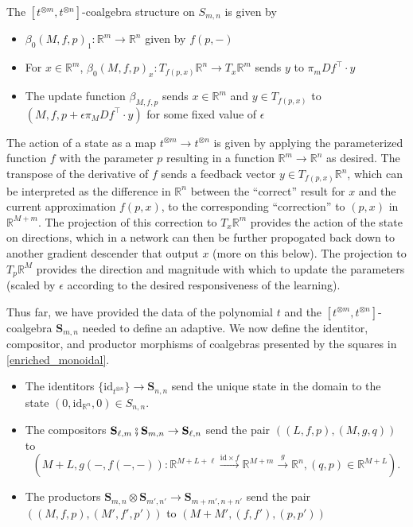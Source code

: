 \documentclass[11pt, one side, article]{memoir}
\theoremstyle{definition}
\theoremstyle{plain}
\newenvironment{definition}
  {\pushQED{\qed}\renewcommand{\qedsymbol}{$\lozenge$}\definitionx}
  {\popQED\enddefinitionx}
\newcommand{\Cat}[1]{\mathbf{#1}}%
\newcommand{\id}{\mathrm{id}}
\newcommand{\then}{\mathbin{\fatsemi}}
\newcommand{\To}[2][]{\xrightarrow[#1]{#2}}
\newcommand{\rr}{\mathbb{R}}
\newcommand{\0}{\textsf{0}}
\newcommand{\1}{\tn{\textsf{1}}}
\renewcommand{\S}{{\Cat{S}}}
\newcommand{\idcoalg}[1]{{\{\id_{#1}\}}}
\begin{document}
\begin{definition}
The $[t^{\otimes m},t^{\otimes n}]$-coalgebra structure on $S_{m,n}$ is given by 
\begin{itemize}
	\item $\beta_0(M,f,p)_1 : \rr^m \to \rr^n$ given by $f(p,-)$
	\item For $x \in \rr^m$, $\beta_0(M,f,p)_x : T_{f(p,x)} \rr^n \to T_x \rr^m$ sends $y$ to $\pi_m Df^\top \cdot y$
	\item The update function $\beta_{M,f,p}$ sends $x \in \rr^m$ and $y \in T_{f(p,x)}$ to $(M,f,p+\epsilon \pi_M Df^\top \cdot y)$ for some fixed value of $\epsilon$
\end{itemize}
\end{definition}

The action of a state as a map $t^{\otimes m} \to t^{\otimes n}$ is given by applying the parameterized function $f$ with the parameter $p$ resulting in a function $\rr^m \to \rr^n$ as desired. The transpose of the derivative of $f$ sends a feedback vector $y \in T_{f(p,x)} \rr^n$, which can be interpreted as the difference in $\rr^n$ between the ``correct'' result for $x$ and the current approximation $f(p,x)$, to the corresponding ``correction'' to $(p,x)$ in $\rr^{M+m}$. The projection of this correction to $T_x \rr^m$ provides the action of the state on directions, which in a network can then be further propogated back down to another gradient descender that output $x$ (more on this below). The projection to $T_p \rr^M$ provides the direction and magnitude with which to update the parameters (scaled by $\epsilon$ according to the desired responsiveness of the learning).

Thus far, we have provided the data of the polynomial $t$ and the $[t^{\otimes m},t^{\otimes n}]$-coalgebra $\S_{m,n}$ needed to define an adaptive. We now define the identitor, compositor, and productor morphisms of coalgebras presented by the squares in \cref{enriched_monoidal}.
\begin{itemize}
	\item The identitors $\idcoalg{t^{\otimes n}} \to \S_{n,n}$ send the unique state in the domain to the state $(0,\id_{\rr^n},0) \in S_{n,n}$. 
	\item The compositors $\S_{\ell,m}\then\S_{m,n} \to \S_{\ell,n}$ send the pair $((L,f,p),(M,g,q))$ to 
$$\left( M+L,g(-,f(-,-)) : \rr^{M+L+\ell} \To{\id \times f} \rr^{M+m} \To{g} \rr^n, (q,p) \in \rr^{M+L} \right).$$
	\item The productors $\S_{m,n} \otimes \S_{m',n'} \to \S_{m+m',n+n'}$ send the pair $((M,f,p),(M',f',p'))$ to $(M+M',(f,f'),(p,p'))$
\end{itemize}
\end{document}
